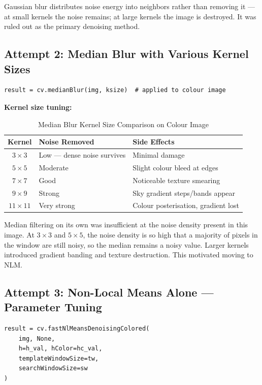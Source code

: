 \documentclass[journal]{IEEEtran}
\begin{document}
Gaussian blur distributes noise energy into neighbors rather than removing it — 
at small kernels the noise remains; at large kernels the image is destroyed. 
It was ruled out as the primary denoising method.

\subsection{Attempt 2: Median Blur with Various Kernel Sizes}
\begin{lstlisting}
result = cv.medianBlur(img, ksize)  # applied to colour image
\end{lstlisting}

\textbf{Kernel size tuning:}

\begin{table}[h]
\centering
\caption{Median Blur Kernel Size Comparison on Colour Image}
\begin{tabular}{@{}cll@{}}
\toprule
Kernel & Noise Removed & Side Effects \\
\midrule
$3\times3$ & Low — dense noise survives & Minimal damage \\
$5\times5$ & Moderate & Slight colour bleed at edges \\
$7\times7$ & Good & Noticeable texture smearing \\
$9\times9$ & Strong & Sky gradient steps/bands appear \\
$11\times11$ & Very strong & Colour posterisation, gradient lost \\
\bottomrule
\end{tabular}
\end{table}

Median filtering on its own was insufficient at the noise density present in this image. 
At $3\times3$ and $5\times5$, the noise density is so high that a majority of pixels 
in the window are still noisy, so the median remains a noisy value. Larger kernels 
introduced gradient banding and texture destruction. This motivated moving to NLM.

\subsection{Attempt 3: Non-Local Means Alone — Parameter Tuning}
\begin{lstlisting}
result = cv.fastNlMeansDenoisingColored(
    img, None,
    h=h_val, hColor=hc_val,
    templateWindowSize=tw,
    searchWindowSize=sw
)
\end{lstlisting}
\end{document}
